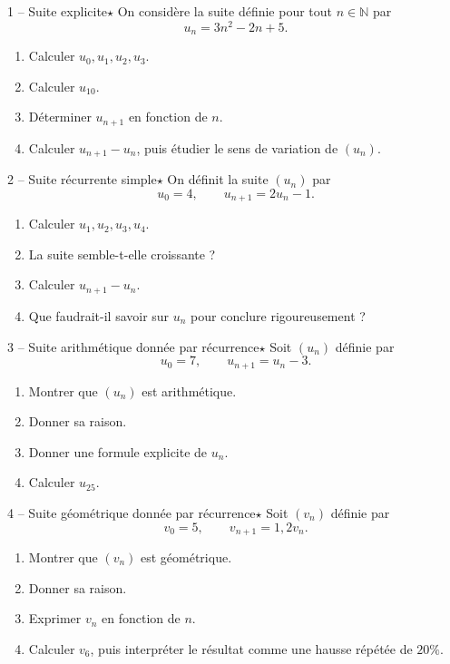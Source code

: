 \documentclass[11pt,a4paper]{article}
\newcommand{\N}{\mathbb{N}}
\newcommand{\etoile}{\(\star\)}
\begin{document}
\begin{exobox}{1 -- Suite explicite}{\etoile}
On considère la suite définie pour tout \(n\in\N\) par
\[
u_n=3n^2-2n+5.
\]
\begin{enumerate}[label=\alph*)]
  \item Calculer \(u_0,u_1,u_2,u_3\).
  \item Calculer \(u_{10}\).
  \item Déterminer \(u_{n+1}\) en fonction de \(n\).
  \item Calculer \(u_{n+1}-u_n\), puis étudier le sens de variation de \((u_n)\).
\end{enumerate}
\end{exobox}

\begin{exobox}{2 -- Suite récurrente simple}{\etoile}
On définit la suite \((u_n)\) par
\[
u_0=4,\qquad u_{n+1}=2u_n-1.
\]
\begin{enumerate}[label=\alph*)]
  \item Calculer \(u_1,u_2,u_3,u_4\).
  \item La suite semble-t-elle croissante ?
  \item Calculer \(u_{n+1}-u_n\).
  \item Que faudrait-il savoir sur \(u_n\) pour conclure rigoureusement ?
\end{enumerate}
\end{exobox}

\begin{exobox}{3 -- Suite arithmétique donnée par récurrence}{\etoile}
Soit \((u_n)\) définie par
\[
u_0=7,\qquad u_{n+1}=u_n-3.
\]
\begin{enumerate}[label=\alph*)]
  \item Montrer que \((u_n)\) est arithmétique.
  \item Donner sa raison.
  \item Donner une formule explicite de \(u_n\).
  \item Calculer \(u_{25}\).
\end{enumerate}
\end{exobox}

\begin{exobox}{4 -- Suite géométrique donnée par récurrence}{\etoile}
Soit \((v_n)\) définie par
\[
v_0=5,\qquad v_{n+1}=1{,}2v_n.
\]
\begin{enumerate}[label=\alph*)]
  \item Montrer que \((v_n)\) est géométrique.
  \item Donner sa raison.
  \item Exprimer \(v_n\) en fonction de \(n\).
  \item Calculer \(v_6\), puis interpréter le résultat comme une hausse répétée de \(20\%\).
\end{enumerate}
\end{exobox}
\end{document}
